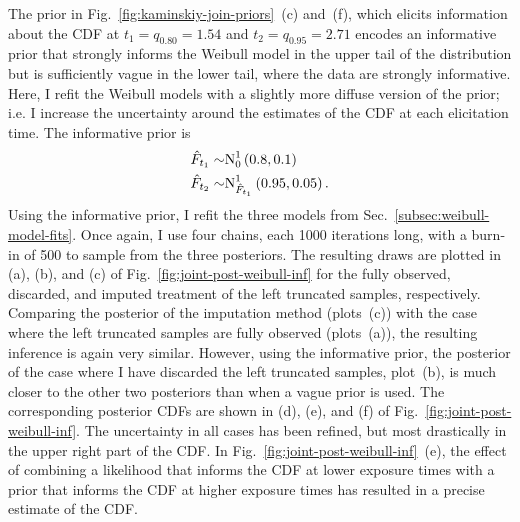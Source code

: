 The prior in Fig.~\ref{fig:kaminskiy-join-priors}~(c) and~(f), which elicits information about the CDF at $t_1 = q_{0.80} = 1.54$ and $t_2 = q_{0.95} = 2.71$ encodes an informative prior that strongly informs the Weibull model in the upper tail of the distribution but is sufficiently vague in the lower tail, where the data are strongly informative. Here, I refit the Weibull models with a slightly more diffuse version of the prior; i.e. I increase the uncertainty around the estimates of the CDF at each elicitation time. The informative prior is
\begin{align*}
    \hat{F}_{t_1} \sim & \hbox{N}^{1}_{0}\left(0.8, 0.1\right)    \\
    \hat{F}_{t_2} \sim & \hbox{N}^{1}_{\hat{F}_{t_1}}\left(0.95, 0.05\right).
\end{align*}
Using the informative prior, I refit the three models from Sec.~\ref{subsec:weibull-model-fits}. Once again, I use four chains, each 1000 iterations long, with a burn-in of 500 to sample from the three posteriors. The resulting draws are plotted in (a), (b), and (c) of Fig.~\ref{fig:joint-post-weibull-inf} for the fully observed, discarded, and imputed treatment of the left truncated samples, respectively. Comparing the posterior of the imputation method (plots~(c)) with the case where the left truncated samples are fully observed (plots~(a)), the resulting inference is again very similar. However, using the informative prior, the posterior of the case where I have discarded the left truncated samples, plot~(b), is much closer to the other two posteriors than when a vague prior is used. The corresponding posterior CDFs are shown in (d), (e), and (f) of Fig.~\ref{fig:joint-post-weibull-inf}. The uncertainty in all cases has been refined, but most drastically in the upper right part of the CDF. In Fig.~\ref{fig:joint-post-weibull-inf}~(e), the effect of combining a likelihood that informs the CDF at lower exposure times with a prior that informs the CDF at higher exposure times has resulted in a precise estimate of the CDF. 

